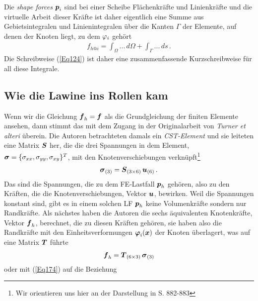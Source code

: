 \begin{remark}
Die {\em shape forces\/} $\mbox{\boldmath $p$}_i$ sind bei einer Scheibe Fl\"{a}chenkr\"{a}fte und Linienkr\"{a}fte und die virtuelle Arbeit dieser Kr\"{a}fte ist daher eigentlich eine Summe aus Gebietsintegralen und Linienintegralen \"{u}ber die Kanten $\Gamma$ der Elemente, auf denen der Knoten liegt, zu dem $\varphi_i$ geh\"{o}rt
\begin{align}
f_{h @i} = \int_{\Omega} ... \,d\Omega + \int_{\Gamma} ...\,ds\,.
\end{align}
Die Schreibweise (\ref{Eq124}) ist daher eine zusammenfassende Kurzschreibweise f\"{u}r all diese Integrale.
\end{remark}
\vspace{-0.5cm}
{\textcolor{sectionTitleBlue}{\section{Wie die Lawine ins Rollen kam}}}
Wenn wir die Gleichung $\mbox{\boldmath $f$}_h = \mbox{\boldmath $f$} $ als die Grundgleichung der finiten Elemente ansehen, dann stimmt das mit dem Zugang in der Originalarbeit \cite{Turner} von {\em Turner et alteri\/} \"{u}berein. Die Autoren betrachteten damals ein {\em CST-Element\/} und sie leiteten eine Matrix $\mbox{\boldmath $S$} $ her, die die drei Spannungen in dem Element, $\mbox{\boldmath $\sigma$} = \{\sigma_{xx}, \sigma_{yy}, \sigma_{xy}\}^T$, mit den Knotenverschiebungen verkn\"{u}pft\footnote{Wir orientieren uns hier an der Darstellung in \cite{Kurrer} S. 882-883}
\begin{align}\label{Eq174}
\mbox{\boldmath $\sigma$}_{(3)} = \mbox{\boldmath $S$}_{(3 \times 6)}\,\mbox{\boldmath $u$}_{(6)} \,.
\end{align}
Das sind die Spannungen, die zu dem FE-Lastfall $\mbox{\boldmath $p$}_h$ geh\"{o}ren, also zu den Kr\"{a}ften, die die Knotenverschiebungen, Vektor $\mbox{\boldmath $u$}$, bewirken. Weil die Spannungen konstant sind, gibt es in einem solchen LF $\mbox{\boldmath $p$}_h$ keine Volumenkr\"{a}fte sondern nur Randkr\"{a}fte. Als n\"{a}chstes haben die Autoren die sechs \"{a}quivalenten Knotenkr\"{a}fte, Vektor $\mbox{\boldmath $f$}_{h}$, berechnet, die zu diesen Kr\"{a}ften geh\"{o}ren, sie haben also die Randkr\"{a}fte mit den Einheitsverformungen $\mbox{\boldmath $\varphi$}_i(\mbox{\boldmath $x$})$ der Knoten \"{u}berlagert, was auf eine Matrix $\mbox{\boldmath $T$} $ f\"{u}hrte
\begin{align}
\mbox{\boldmath $f$}_h = \mbox{\boldmath $T$}_{(6 \times 3)}\,\mbox{\boldmath $\sigma$}_{(3)}
\end{align}
oder mit (\ref{Eq174}) auf die Beziehung
